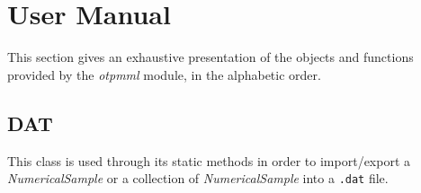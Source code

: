 % 

\section{User Manual}

This section gives an exhaustive presentation of the objects and functions provided by the \textit{otpmml} module, in the alphabetic order.


\subsection{DAT}

This class is used through its static methods in order to import\slash export a \textit{NumericalSample} or a collection of \textit{NumericalSample} into a \texttt{.dat} file.

